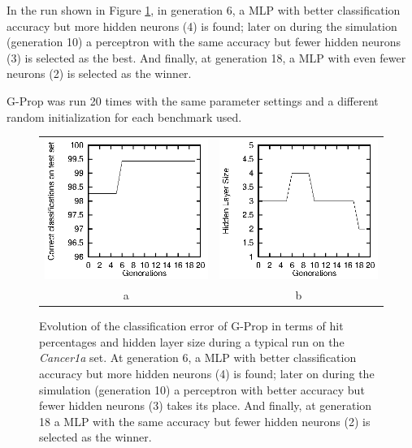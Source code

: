 \documentclass{llncs}
\begin{document}
In the run shown in Figure \ref{fig:graf}, in generation 6, a MLP with better classification accuracy but more hidden neurons (4) is found; later on during the simulation (generation 10) a perceptron with the same accuracy but fewer hidden neurons (3) is selected as the best. And finally, at generation 18, a MLP with even fewer neurons (2) is selected as the winner.

G-Prop was run 20 times with the same parameter settings and a different random initialization for each benchmark used.

\begin{figure}[!h] 
\begin{center}
\begin{tabular}{cc}
\includegraphics{hit.eps} & \includegraphics{size.eps} \\
a & b
\end{tabular}
\end{center}
\label{fig:graf}
\caption{\small{Evolution of the classification error of G-Prop in terms of hit percentages and hidden layer size during a typical run on the \emph{Cancer1a} set. At generation 6, a MLP with better classification accuracy but more hidden neurons (4) is found; later on during the simulation (generation 10) a perceptron with better accuracy but fewer hidden neurons (3) takes its place. And finally, at generation 18 a MLP with the same accuracy but fewer hidden neurons (2) is selected as the winner.}}
\end{figure}
\end{document}
